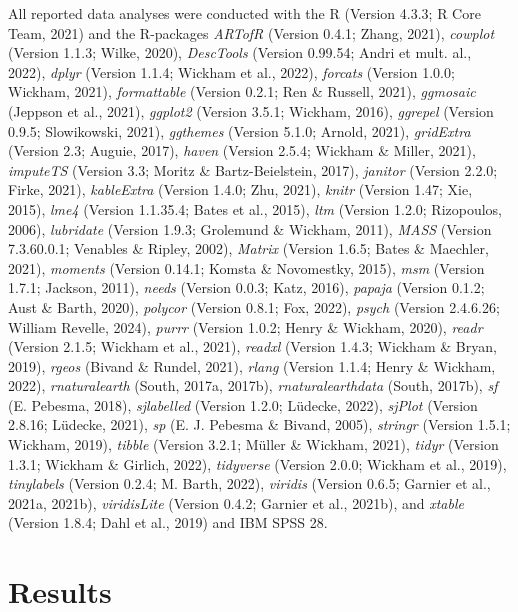 \documentclass[
  man]{apa6}
\begin{document}
All reported data analyses were conducted with the R (Version 4.3.3; R Core Team, 2021) and the R-packages \emph{ARTofR} (Version 0.4.1; Zhang, 2021), \emph{cowplot} (Version 1.1.3; Wilke, 2020), \emph{DescTools} (Version 0.99.54; Andri et mult. al., 2022), \emph{dplyr} (Version 1.1.4; Wickham et al., 2022), \emph{forcats} (Version 1.0.0; Wickham, 2021), \emph{formattable} (Version 0.2.1; Ren \& Russell, 2021), \emph{ggmosaic} (Jeppson et al., 2021), \emph{ggplot2} (Version 3.5.1; Wickham, 2016), \emph{ggrepel} (Version 0.9.5; Slowikowski, 2021), \emph{ggthemes} (Version 5.1.0; Arnold, 2021), \emph{gridExtra} (Version 2.3; Auguie, 2017), \emph{haven} (Version 2.5.4; Wickham \& Miller, 2021), \emph{imputeTS} (Version 3.3; Moritz \& Bartz-Beielstein, 2017), \emph{janitor} (Version 2.2.0; Firke, 2021), \emph{kableExtra} (Version 1.4.0; Zhu, 2021), \emph{knitr} (Version 1.47; Xie, 2015), \emph{lme4} (Version 1.1.35.4; Bates et al., 2015), \emph{ltm} (Version 1.2.0; Rizopoulos, 2006), \emph{lubridate} (Version 1.9.3; Grolemund \& Wickham, 2011), \emph{MASS} (Version 7.3.60.0.1; Venables \& Ripley, 2002), \emph{Matrix} (Version 1.6.5; Bates \& Maechler, 2021), \emph{moments} (Version 0.14.1; Komsta \& Novomestky, 2015), \emph{msm} (Version 1.7.1; Jackson, 2011), \emph{needs} (Version 0.0.3; Katz, 2016), \emph{papaja} (Version 0.1.2; Aust \& Barth, 2020), \emph{polycor} (Version 0.8.1; Fox, 2022), \emph{psych} (Version 2.4.6.26; William Revelle, 2024), \emph{purrr} (Version 1.0.2; Henry \& Wickham, 2020), \emph{readr} (Version 2.1.5; Wickham et al., 2021), \emph{readxl} (Version 1.4.3; Wickham \& Bryan, 2019), \emph{rgeos} (Bivand \& Rundel, 2021), \emph{rlang} (Version 1.1.4; Henry \& Wickham, 2022), \emph{rnaturalearth} (South, 2017a, 2017b), \emph{rnaturalearthdata} (South, 2017b), \emph{sf} (E. Pebesma, 2018), \emph{sjlabelled} (Version 1.2.0; Lüdecke, 2022), \emph{sjPlot} (Version 2.8.16; Lüdecke, 2021), \emph{sp} (E. J. Pebesma \& Bivand, 2005), \emph{stringr} (Version 1.5.1; Wickham, 2019), \emph{tibble} (Version 3.2.1; Müller \& Wickham, 2021), \emph{tidyr} (Version 1.3.1; Wickham \& Girlich, 2022), \emph{tidyverse} (Version 2.0.0; Wickham et al., 2019), \emph{tinylabels} (Version 0.2.4; M. Barth, 2022), \emph{viridis} (Version 0.6.5; Garnier et al., 2021a, 2021b), \emph{viridisLite} (Version 0.4.2; Garnier et al., 2021b), and \emph{xtable} (Version 1.8.4; Dahl et al., 2019) and IBM SPSS 28.

\section{Results}\label{results}
\end{document}
